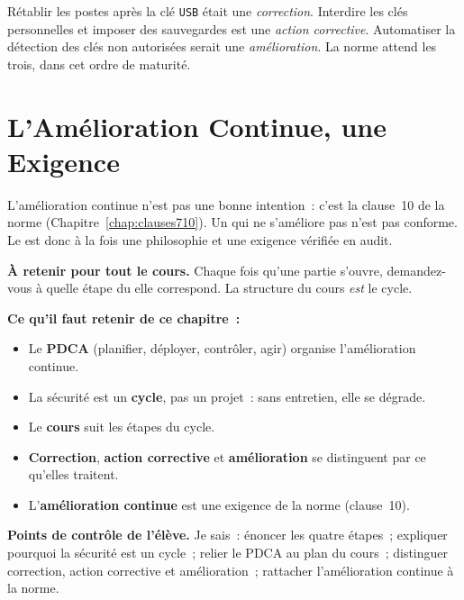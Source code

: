 Rétablir les postes après la clé \texttt{USB} était une \emph{correction}.
Interdire les clés personnelles et imposer des sauvegardes est une \emph{action
corrective}. Automatiser la détection des clés non autorisées serait une
\emph{amélioration}. La norme attend les trois, dans cet ordre de maturité.

\section{L'Amélioration Continue, une Exigence}
\label{sec:c03-exigence}

L'amélioration continue n'est pas une bonne intention~: c'est la clause~10 de
la norme  (Chapitre~\ref{chap:clauses710}). Un
 qui ne s'améliore pas n'est pas conforme. Le  est donc
à la fois une philosophie et une exigence vérifiée en audit.

\begin{boxinfo}
\textbf{À retenir pour tout le cours.} Chaque fois qu'une partie s'ouvre,
demandez-vous à quelle étape du  elle correspond. La structure du
cours \emph{est} le cycle.
\end{boxinfo}

\separateur

\begin{boxresume}
\textbf{Ce qu'il faut retenir de ce chapitre~:}
\begin{itemize}
    \item Le \textbf{PDCA} (planifier, déployer, contrôler, agir) organise
          l'amélioration continue.
    \item La sécurité est un \textbf{cycle}, pas un projet~: sans entretien,
          elle se dégrade.
    \item Le \textbf{cours} suit les étapes du cycle.
    \item \textbf{Correction}, \textbf{action corrective} et
          \textbf{amélioration} se distinguent par ce qu'elles traitent.
    \item L'\textbf{amélioration continue} est une exigence de la norme
          (clause~10).
\end{itemize}
\end{boxresume}

\begin{boxinfo}
\textbf{Points de contrôle de l'élève.} Je sais~: énoncer les quatre étapes~;
expliquer pourquoi la sécurité est un cycle~; relier le PDCA au plan du cours~;
distinguer correction, action corrective et amélioration~; rattacher
l'amélioration continue à la norme.
\end{boxinfo}

